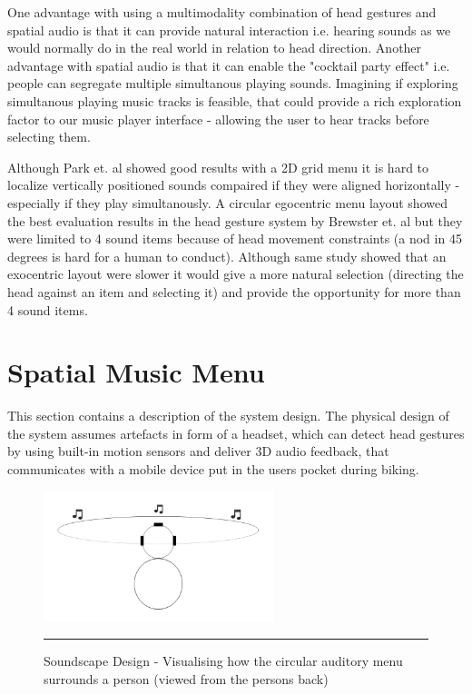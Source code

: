 One advantage with using a multimodality combination of head gestures and spatial audio is that it can provide natural interaction \cite{gaver_auditory_1986} i.e. hearing sounds as we would normally do in the real world in relation to head direction. Another advantage with spatial audio is that it can enable the "cocktail party effect" \cite{bronkhorst_cocktail_2000} i.e. people can segregate multiple simultanous playing sounds. Imagining if exploring simultanous playing music tracks is feasible, that could provide a rich exploration factor to our music player interface - allowing the user to hear tracks before selecting them.

Although Park et. al \cite{park_gaze-directed_2011} showed good results with a 2D grid menu it is hard to localize vertically positioned sounds compaired if they were aligned horizontally - especially if they play simultanously. A circular egocentric menu layout showed the best evaluation results in the head gesture system by Brewster et. al \cite{brewster_multimodaleyes-freeinteraction_2003} but they were limited to 4 sound items because of head movement constraints (a nod in 45 degrees is hard for a human to conduct). Although same study showed that an exocentric layout were slower it would give a more natural selection (directing the head against an item and selecting it) and provide the opportunity for more than 4 sound items.


\section{Spatial Music Menu}
This section contains a description of the system design. The physical design of the system assumes artefacts in form of a headset, which can detect head gestures by using built-in motion sensors and deliver 3D audio feedback, that communicates with a mobile device put in the users pocket during biking.

\begin{figure}[t]
	\centering
		\includegraphics[width=0.6\textwidth,height=\textheight,keepaspectratio]{./Figures/sounddesign.png}
		\rule{35em}{0.5pt}
	\caption[Soundscape Design]{Soundscape Design - Visualising how the circular auditory menu surrounds a person (viewed from the persons back)}
	\label{fig:sounddesign}
\end{figure}

